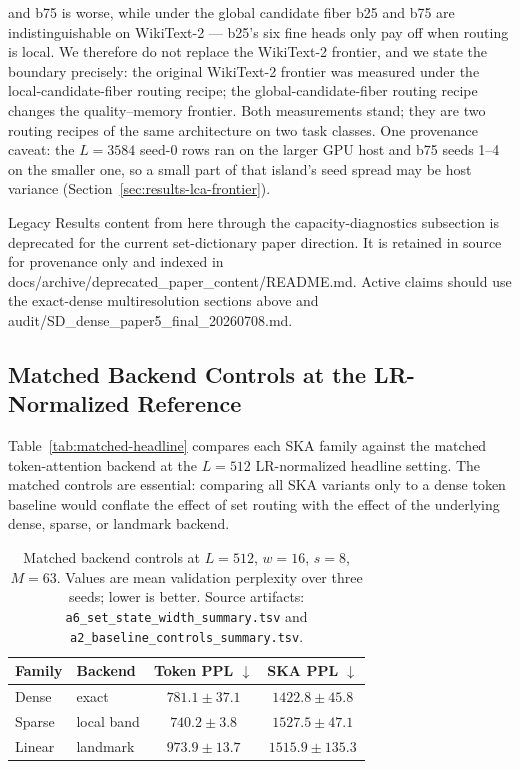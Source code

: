 \documentclass{article}
\theoremstyle{plain}
\theoremstyle{definition}
\theoremstyle{remark}
\begin{document}
and b75 is worse, while under the global candidate fiber b25 and b75 are
indistinguishable on WikiText-2
--- b25's six fine heads only pay off when routing is local.  We therefore
do not replace the WikiText-2 frontier, and we state the boundary precisely:
the original WikiText-2 frontier was measured under the local-candidate-fiber
routing recipe; the global-candidate-fiber routing recipe changes the
quality--memory frontier.  Both measurements stand; they are two routing
recipes of the same architecture on two task classes.  One provenance caveat:
the $L=3584$ seed-0 rows ran on the larger GPU
host and b75 seeds 1--4 on the smaller one, so a small part of that island's
seed spread may be host variance (Section~\ref{sec:results-lca-frontier}).

\iffalse
Legacy Results content from here through the capacity-diagnostics subsection
is deprecated for the current set-dictionary paper direction.  It is retained
in source for provenance only and indexed in
docs/archive/deprecated_paper_content/README.md.  Active claims should use the
exact-dense multiresolution sections above and
audit/SD_dense_paper5_final_20260708.md.

\subsection{Matched Backend Controls at the LR-Normalized Reference}
\label{sec:results-matched-controls}

Table~\ref{tab:matched-headline} compares each SKA family against the matched
token-attention backend at the $L=512$ LR-normalized headline setting.  The
matched controls are essential: comparing all SKA variants only to a dense
token baseline would conflate the effect of set routing with the effect of the
underlying dense, sparse, or landmark backend.

\begin{table}[t]
\centering
\caption{Matched backend controls at $L=512$, $w=16$, $s=8$, $M=63$.  Values
are mean validation perplexity over three seeds; lower is better.  Source
artifacts: \texttt{a6\_set\_state\_width\_summary.tsv} and
\texttt{a2\_baseline\_controls\_summary.tsv}.}
\label{tab:matched-headline}
\label{tab:matched-baseline-vs-setonly}
\scriptsize
\begin{tabular}{llcc}
\toprule
Family & Backend & Token PPL $\downarrow$ & SKA PPL $\downarrow$ \\
\midrule
Dense & exact & $781.1 \pm 37.1$ & $1422.8 \pm 45.8$ \\
Sparse & local band & $740.2 \pm 3.8$ & $1527.5 \pm 47.1$ \\
Linear & landmark & $973.9 \pm 13.7$ & $1515.9 \pm 135.3$ \\
\bottomrule
\end{tabular}
\end{table}
\end{document}
